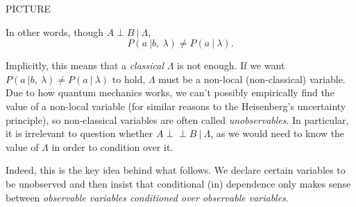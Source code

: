 \documentclass[11pt, oneside]{article}   	%
\def\ci{\perp\!\!\!\perp}
\newcommand{\pablo}[1]{{\color{red}#1}}
\begin{document}
PICTURE

In other words, though $A \perp B \ | \ \Lambda$, \[ P(a \ | b,\ \lambda) \neq P(a \ | \ \lambda).\]

Implicitly, this means that a \textit{classical} $\Lambda$ is not enough. \pablo{If we want \(P(a \ | b,\ \lambda) \neq P(a \ | \ \lambda)\) to hold, \(\Lambda\) must be a non-local (non-classical) variable}. \pablo{Due to how quantum mechanics works, we can't possibly empirically find the value of a non-local variable (for similar reasons to the Heisenberg's uncertainty principle), so non-classical variables are often called \textit{unobservables}}. In particular, it is irrelevant to question whether $A \ci B \ | \ \Lambda$, \pablo{as we would need to know the value of \(\Lambda\) in order to condition over it}.

Indeed, this is the key idea behind what follows. We declare certain variables to be unobserved and then insist that conditional (in)
dependence only makes sense between \emph{observable variables conditioned over observable variables}.


%
%
%
%
%
%
%
%
%
%
%
%
%
%
%
\end{document}
